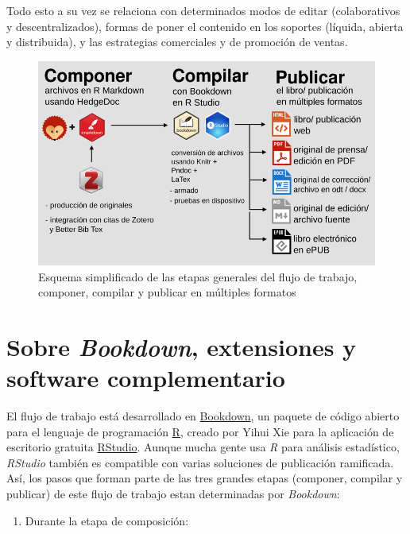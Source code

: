 \documentclass[
]{book}
\providecommand{\tightlist}{%
  \setlength{\itemsep}{0pt}\setlength{\parskip}{0pt}}
\begin{document}
Todo esto a su vez se relaciona con determinados modos de editar (colaborativos y descentralizados), formas de poner el contenido en los soportes (líquida, abierta y distribuida), y las estrategias comerciales y de promoción de ventas.



\begin{figure}

{\centering \includegraphics[width=0.8\linewidth]{images/workflow} 

}

\caption{Esquema simplificado de las etapas generales del flujo de trabajo, componer, compilar y publicar en múltiples formatos}\label{fig:workflow}
\end{figure}

\hypertarget{sobre-bookdown-extensiones-y-software-complementario}{%
\section{\texorpdfstring{Sobre \emph{Bookdown}, extensiones y software complementario}{Sobre Bookdown, extensiones y software complementario}}\label{sobre-bookdown-extensiones-y-software-complementario}}

El flujo de trabajo está desarrollado en \href{https://bookdown.org}{Bookdown}, un paquete de código abierto para el lenguaje de programación \href{https://www.r-project.org/}{R}, creado por Yihui Xie para la aplicación de escritorio gratuita \href{https://rstudio.com/}{RStudio}. Aunque mucha gente usa \emph{R} para análisis estadístico, \emph{RStudio} también es compatible con varias soluciones de publicación ramificada. Así, los pasos que forman parte de las tres grandes etapas (componer, compilar y publicar) de este flujo de trabajo estan determinadas por \emph{Bookdown}:

\begin{enumerate}
\def\labelenumi{\arabic{enumi}.}
\tightlist
\item
  Durante la etapa de composición:
\end{enumerate}
\end{document}
